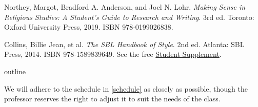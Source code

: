 \documentclass[titlepage]{article}
\begin{document}
\begingroup
\renewcommand{\section}[2]{}%
\begin{thebibliography}{Making Sense}%

	 Northey, Margot, Bradford A. Anderson, and Joel N. Lohr.
	\emph{Making Sense in Religious Studies: A Student's Guide to Research and Writing}.
	3rd ed. Toronto: Oxford University Press, 2019. ISBN 978-0199026838.

	 Collins, Billie Jean, et al.
	\emph{The SBL Handbook of Style}.
	2nd ed. Atlanta: SBL Press, 2014. ISBN 978-1589839649. See the free
	\href{https://www.sbl-site.org/wp-content/uploads/2025/04/SBLHSsupp2015-02.pdf}{Student Supplement}.

\end{thebibliography}
\endgroup

\section{Course Outline}
\label{outline}

We will adhere to the schedule in \autoref{schedule} as closely as
possible, though the professor reserves the right to adjust it to suit
the needs of the class.
\end{document}

